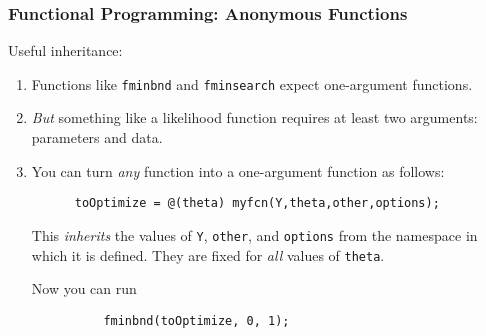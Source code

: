 \documentclass{beamer}
\begin{document}
  \begin{frame}[fragile]
    \frametitle{Functional Programming: Anonymous Functions}

    Useful inheritance:
    \begin{enumerate}
      \item Functions like \texttt{fminbnd} and \texttt{fminsearch}
        expect one-argument functions.\pause
      \item \emph{But} something like a likelihood function requires at
        least two arguments: parameters and data.\pause
      \item You can turn \emph{any} function into a one-argument
        function as follows:
        \begin{lstlisting}
      toOptimize = @(theta) myfcn(Y,theta,other,options);
        \end{lstlisting}
        This \emph{inherits} the values of \texttt{Y}, \texttt{other},
        and \texttt{options} from the namespace in which it is defined.
        They are fixed for \emph{all} values of \texttt{theta}.
        \vspace{10pt}

        Now you can run
        \begin{lstlisting}
          fminbnd(toOptimize, 0, 1);
        \end{lstlisting}
    \end{enumerate}
	\end{frame}
\end{document}

